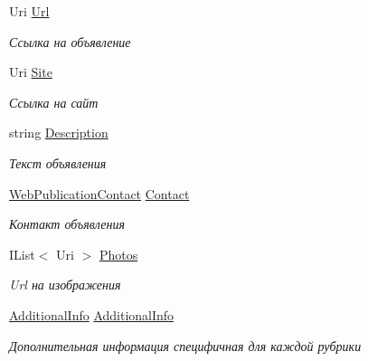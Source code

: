 \begin{DoxyCompactItemize}
Uri \hyperlink{class_r_t_1_1_parsing_libs_1_1_models_1_1_web_publication_a0454089a5089f84a07ab7319af913ad1}{Url}
\begin{DoxyCompactList}\small\item\em Ссылка на объявление \end{DoxyCompactList}\item 
Uri \hyperlink{class_r_t_1_1_parsing_libs_1_1_models_1_1_web_publication_ac9d070259cf5f0f2beb25a4cd9596531}{Site}
\begin{DoxyCompactList}\small\item\em Ссылка на сайт \end{DoxyCompactList}\item 
string \hyperlink{class_r_t_1_1_parsing_libs_1_1_models_1_1_web_publication_a7e4f6b52fd3540c2b1a53d5371f82165}{Description}
\begin{DoxyCompactList}\small\item\em Текст объявления \end{DoxyCompactList}\item 
\hyperlink{class_r_t_1_1_parsing_libs_1_1_models_1_1_web_publication_contact}{Web\+Publication\+Contact} \hyperlink{class_r_t_1_1_parsing_libs_1_1_models_1_1_web_publication_a34ef01cdaf0cf3f46daf5cecb67e2013}{Contact}
\begin{DoxyCompactList}\small\item\em Контакт объявления \end{DoxyCompactList}\item 
I\+List$<$ Uri $>$ \hyperlink{class_r_t_1_1_parsing_libs_1_1_models_1_1_web_publication_a01108884b89ec964466b0db8c187d031}{Photos}
\begin{DoxyCompactList}\small\item\em Url на изображения \end{DoxyCompactList}\item 
\hyperlink{class_r_t_1_1_parsing_libs_1_1_models_1_1_additional_info}{Additional\+Info} \hyperlink{class_r_t_1_1_parsing_libs_1_1_models_1_1_web_publication_a7ad67a0169bb55e489a7b22ea3a8e507}{Additional\+Info}
\begin{DoxyCompactList}\small\item\em Дополнительная информация специфичная для каждой рубрики \end{DoxyCompactList}\end{DoxyCompactItemize}


